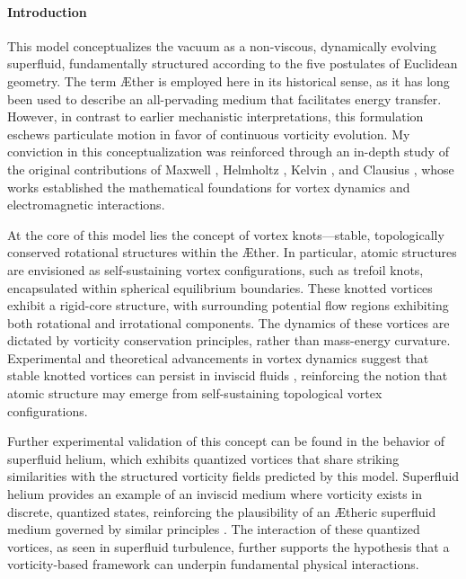 \documentclass[a4paper,10pt]{article}
\begin{document}
    \paragraph{Introduction}
    This model conceptualizes the vacuum as a non-viscous, dynamically evolving superfluid, fundamentally structured according to the five postulates of Euclidean geometry. The term \AE ther is employed here in its historical sense, as it has long been used to describe an all-pervading medium that facilitates energy transfer. However, in contrast to earlier mechanistic interpretations, this formulation eschews particulate motion in favor of continuous vorticity evolution. My conviction in this conceptualization was reinforced through an in-depth study of the original contributions of Maxwell \cite{maxwell1861}, Helmholtz \cite{helmholtz1858}, Kelvin \cite{kelvin1867}, and Clausius \cite{clausius1865}, whose works established the mathematical foundations for vortex dynamics and electromagnetic interactions.

    At the core of this model lies the concept of vortex knots—stable, topologically conserved rotational structures within the \AE ther. In particular, atomic structures are envisioned as self-sustaining vortex configurations, such as trefoil knots, encapsulated within spherical equilibrium boundaries. These knotted vortices exhibit a rigid-core structure, with surrounding potential flow regions exhibiting both rotational and irrotational components. The dynamics of these vortices are dictated by vorticity conservation principles, rather than mass-energy curvature. Experimental and theoretical advancements in vortex dynamics suggest that stable knotted vortices can persist in inviscid fluids \cite{kleckner2013}, reinforcing the notion that atomic structure may emerge from self-sustaining topological vortex configurations.

    Further experimental validation of this concept can be found in the behavior of superfluid helium, which exhibits quantized vortices that share striking similarities with the structured vorticity fields predicted by this model. Superfluid helium provides an example of an inviscid medium where vorticity exists in discrete, quantized states, reinforcing the plausibility of an \AE theric superfluid medium governed by similar principles \cite{vinen2002}. The interaction of these quantized vortices, as seen in superfluid turbulence, further supports the hypothesis that a vorticity-based framework can underpin fundamental physical interactions.
\end{document}
